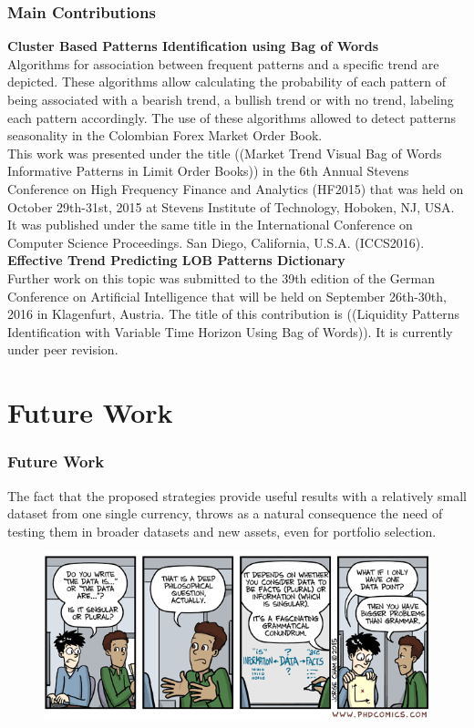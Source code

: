 \documentclass{beamer}
\begin{document}
\begin{frame}
\frametitle{Main Contributions}
\small\textbf{Cluster Based Patterns Identification using Bag of Words}\\
Algorithms for association between frequent patterns and a specific trend are depicted. These algorithms allow calculating the probability of each pattern of being associated with a bearish trend, a bullish trend or with no trend, labeling each pattern accordingly. The use of these algorithms allowed to detect patterns seasonality in the Colombian Forex Market Order Book.\\
This work was presented under the title ((Market Trend Visual Bag of Words Informative Patterns in Limit Order Books)) in the 6th Annual Stevens Conference on High Frequency Finance and Analytics (HF2015) that was held on October 29th-31st, 2015 at Stevens Institute of Technology, Hoboken, NJ, USA. It was published under the same title in the International Conference on Computer Science Proceedings. San Diego, California, U.S.A. (ICCS2016).
\textbf{Effective Trend Predicting LOB Patterns Dictionary}\\
Further work on this topic was submitted to the 39th edition of the German Conference on Artificial Intelligence that will be held on September 26th-30th, 2016 in Klagenfurt, Austria. The title of this contribution is ((Liquidity Patterns Identification with Variable Time Horizon Using Bag of Words)). It is currently under peer revision.\\
\end{frame}
\section{Future Work}
\begin{frame}
\frametitle{Future Work}
The fact that the proposed strategies provide useful results with a relatively small dataset from one single currency, throws as a natural consequence the need of testing them in broader datasets and new assets, even for portfolio selection. 

\begin{figure}
	\centering
		\includegraphics[scale=0.5]{futureWork.png}
	\label{fig:futureWork}
\end{figure}

\end{frame}
\end{document}
